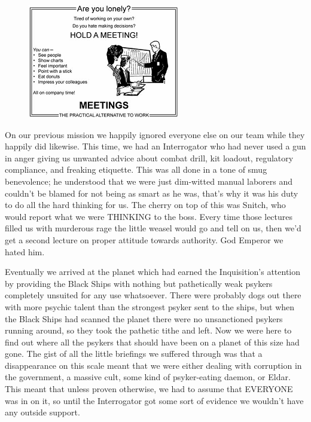 \begin{figure}
	\begin{center}
		\includegraphics[width=\figwidth]{pics/3/7.png}
	\end{center}
\end{figure}
On our previous mission we happily ignored everyone else on our team while they happily did likewise. 
This time, we had an Interrogator who had never used a gun in anger giving us unwanted advice about combat drill, kit loadout, regulatory compliance, and freaking etiquette. 
This was all done in a tone of smug benevolence; he understood that we were just dim-witted manual laborers and couldn’t be blamed for not being as smart as he was, that’s why it was his duty to do all the hard thinking for us. 
The cherry on top of this was Snitch, who would report what we were THINKING to the boss. 
Every time those lectures filled us with murderous rage the little weasel would go and tell on us, then we’d get a second lecture on proper attitude towards authority. God Emperor we hated him.

Eventually we arrived at the planet which had earned the Inquisition’s attention by providing the Black Ships with nothing but pathetically weak psykers completely unsuited for any use whatsoever. 
There were probably dogs out there with more psychic talent than the strongest psyker sent to the ships, but when the Black Ships had scanned the planet there were no unsanctioned psykers running around, so they took the pathetic tithe and left. 
Now we were here to find out where all the psykers that should have been on a planet of this size had gone. 
The gist of all the little briefings we suffered through was that a disappearance on this scale meant that we were either dealing with corruption in the government, a massive cult, some kind of psyker-eating daemon, or Eldar. 
This meant that unless proven otherwise, we had to assume that EVERYONE was in on it, so until the Interrogator got some sort of evidence we wouldn’t have any outside support.

